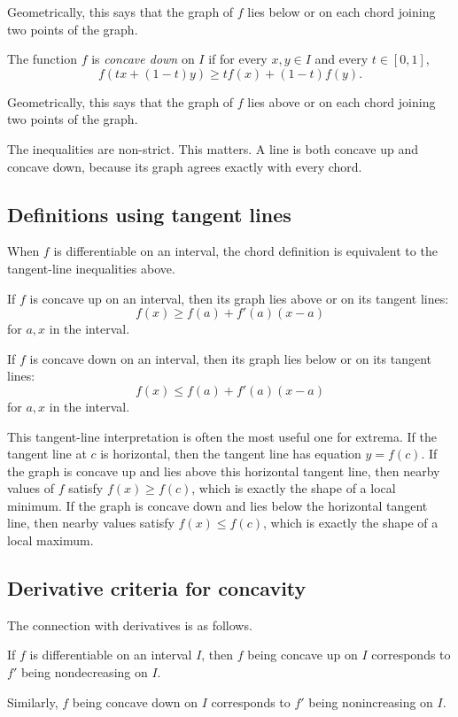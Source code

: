 \documentclass{essay}
\begin{document}
Geometrically, this says that the graph of \(f\) lies below or on each chord joining two points of the graph.

The function \(f\) is \emph{concave down} on \(I\) if for every \(x,y\in I\) and every \(t\in[0,1]\),
\[
f(tx+(1-t)y)
\geq
t f(x)+(1-t)f(y).
\]

Geometrically, this says that the graph of \(f\) lies above or on each chord joining two points of the graph.

The inequalities are non-strict. This matters. A line is both concave up and concave down, because its graph agrees exactly with every chord.

\subsection{Definitions using tangent lines}

When \(f\) is differentiable on an interval, the chord definition is equivalent to the tangent-line inequalities above.

If \(f\) is concave up on an interval, then its graph lies above or on its tangent lines:
\[
f(x)\geq f(a)+f'(a)(x-a)
\]
for \(a,x\) in the interval.

If \(f\) is concave down on an interval, then its graph lies below or on its tangent lines:
\[
f(x)\leq f(a)+f'(a)(x-a)
\]
for \(a,x\) in the interval.

This tangent-line interpretation is often the most useful one for extrema. If the tangent line at \(c\) is horizontal, then the tangent line has equation \(y=f(c)\). If the graph is concave up and lies above this horizontal tangent line, then nearby values of \(f\) satisfy \(f(x)\geq f(c)\), which is exactly the shape of a local minimum. If the graph is concave down and lies below the horizontal tangent line, then nearby values satisfy \(f(x)\leq f(c)\), which is exactly the shape of a local maximum.

\subsection{Derivative criteria for concavity}

The connection with derivatives is as follows.

If \(f\) is differentiable on an interval \(I\), then \(f\) being concave up on \(I\) corresponds to \(f'\) being nondecreasing on \(I\).

Similarly, \(f\) being concave down on \(I\) corresponds to \(f'\) being nonincreasing on \(I\).
\end{document}
